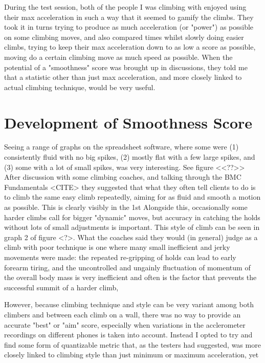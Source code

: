 During the test session, both of the people I was climbing with enjoyed using their max acceleration in such a way that it seemed to gamify the climbs.
They took it in turns trying to produce as much acceleration (or "power") as possible on some climbing moves, and also compared times whilst slowly doing easier climbs, trying to keep their max acceleration down to as low a score as possible, moving do a certain climbing move as much speed as possible.
When the potential of a "smoothness" score was brought up in discussions, they told me that a statistic other than just max acceleration, and more closely linked to actual climbing technique, would be very useful.


\section{Development of Smoothness Score}
Seeing a range of graphs on the spreadsheet software, where some were (1) consistently fluid with no big spikes, (2) mostly flat with a few large spikes,  and (3) some with a lot of small spikes, was very interesting. 
See figure <<??>>
After discussion with some climbing coaches, and talking through the BMC Fundamentals <CITE> they suggested that what they often tell clients to do is to climb the same easy climb repeatedly, aiming for as fluid and smooth a motion as possible. This is clearly visibly in the 1st
Alongside this, occasionally some harder climbs call for bigger "dynamic" moves, but accuracy in catching the holds without lots of small adjustments is important. This style of climb can be seen in graph 2 of figure <?>.
What the coaches said they would (in general) judge as a climb with poor technique is one where many small inefficient and jerky movements were made: the repeated re-gripping of holds can lead to early forearm tiring, and the uncontrolled and ungainly fluctuation of momentum of the overall body mass is very inefficient and often is the factor that prevents the successful summit of a harder climb,   

However, because climbing technique and style can be very variant among both climbers and between each climb on a wall, there was no way to provide an accurate "best" or "aim" score, especially when variations in the acclerometer recordings on different phones is taken into account.
Instead I opted to try and find some form of quantizable metric that, as the testers had suggested, was more closely linked to climbing style than just minimum or maximum acceleration, yet 


